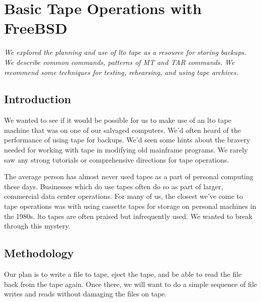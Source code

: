 \chapter{Basic Tape Operations with FreeBSD }
\begin{center}\vspace{-0.5\baselineskip}\parbox{0.85\textwidth}{\small\itshape
We explored the planning and use of \gls{lto} tape as a resource for storing backups.  We describe common commands, patterns of MT and TAR commands.  We recommend some techniques for testing, rehearsing, and using tape archives.\par}\end{center}
\section{Introduction}

We wanted to see if it would be possible for us to make use of an  \gls{lto} tape machine that was on one of our salvaged computers.  We'd often heard of the performance of using tape for backups.  We'd seen some hints about the bravery needed for working with tape in modifying old mainframe programs.  We rarely saw any strong tutorials or comprehensive directions for tape operations.

The average person has almost never used tapes as a part of personal computing these days.  Businesses which do use tapes often do so as part of larger, commercial data center operations.  For many of us, the closest we've come to tape operations was with using cassette tapes for storage on personal machines in the 1980s.   \gls{lto} tapes are often praised but infrequently used.  We wanted to break through this mystery.



\section{Methodology}

Our plan is to write a file to tape, eject the tape, and be able to read the file back from the tape again.  Once there, we will want to do a simple sequence of file writes and reads without damaging the files on tape.



